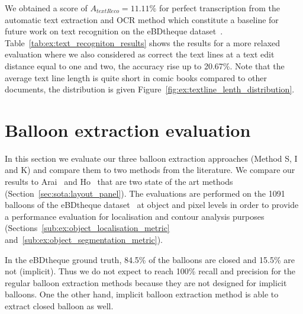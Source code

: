 We obtained a score of $A_{textReco}=11.11\%$ for perfect transcription from the automatic text extraction and OCR method which constitute a baseline for future work on text recognition on the eBDtheque dataset~\cite{Guerin2013}.
Table~\ref{tab:ex:text_recogniton_results} shows the results for a more relaxed evaluation where we also considered as correct the text lines at a text edit distance equal to one and two, the accuracy rise up to 20.67\%.
Note that the average text line length is quite short in comic books compared to other documents, the distribution is given Figure~\ref{fig:ex:textline_lenth_distribution}.




\section{Balloon extraction evaluation} %
\label{sub:ex:balloon_extraction_evaluation}
In this section we evaluate our three balloon extraction approaches (Method S, I and K) and compare them to two methods from the literature.
We compare our results to Arai~\cite{Arai10} and Ho~\cite{Ho2012} that are two state of the art methods (Section~\ref{sec:sota:layout_panel}).
The evaluations are performed on the 1091 balloons of the eBDtheque dataset~\cite{Guerin2013} at object and pixel levels in order to provide a performance evaluation for localisation and contour analysis purposes (Sections~\ref{sub:ex:object_localisation_metric} and~\ref{sub:ex:object_segmentation_metric}).

In the eBDtheque ground truth, 84.5\% of the balloons are closed and 15.5\% are not (implicit).
Thus we do not expect to reach 100\% recall and precision for the regular balloon extraction methods because they are not designed for implicit balloons.
One the other hand, implicit balloon extraction method is able to extract closed balloon as well.

